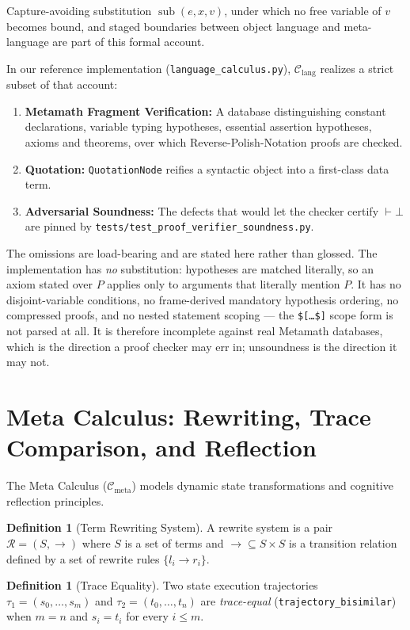 \documentclass[11pt]{article}
\theoremstyle{definition}
\newtheorem{definition}[theorem]{Definition}
\begin{document}
Capture-avoiding substitution $\operatorname{sub}(e, x, v)$, under which no free variable of $v$ becomes bound, and staged boundaries between object language and meta-language are part of this formal account.

In our reference implementation (\texttt{language\_calculus.py}), $\mathcal{C}_{\mathrm{lang}}$ realizes a strict subset of that account:
\begin{enumerate}
\item \textbf{Metamath Fragment Verification:} A database distinguishing constant declarations, variable typing hypotheses, essential assertion hypotheses, axioms and theorems, over which Reverse-Polish-Notation proofs are checked.
\item \textbf{Quotation:} \texttt{QuotationNode} reifies a syntactic object into a first-class data term.
\item \textbf{Adversarial Soundness:} The defects that would let the checker certify $\vdash \bot$ are pinned by \texttt{tests/test\_proof\_verifier\_soundness.py}.
\end{enumerate}

\noindent The omissions are load-bearing and are stated here rather than glossed. The implementation has \emph{no} substitution: hypotheses are matched literally, so an axiom stated over $P$ applies only to arguments that literally mention $P$. It has no disjoint-variable conditions, no frame-derived mandatory hypothesis ordering, no compressed proofs, and no nested statement scoping --- the \texttt{\$[\dots\$]} scope form is not parsed at all. It is therefore incomplete against real Metamath databases, which is the direction a proof checker may err in; unsoundness is the direction it may not.

\section{Meta Calculus: Rewriting, Trace Comparison, and Reflection}
The Meta Calculus ($\mathcal{C}_{\mathrm{meta}}$) models dynamic state transformations and cognitive reflection principles.

\begin{definition}[Term Rewriting System]
A rewrite system is a pair $\mathcal{R} = (S, \to)$ where $S$ is a set of terms and $\to \subseteq S \times S$ is a transition relation defined by a set of rewrite rules $\{l_i \to r_i\}$.
\end{definition}

\begin{definition}[Trace Equality]
Two state execution trajectories $\tau_1 = (s_0, \dots, s_m)$ and $\tau_2 = (t_0, \dots, t_n)$ are \emph{trace-equal} (\texttt{trajectory\_bisimilar}) when $m = n$ and $s_i = t_i$ for every $i \le m$.
\end{definition}
\end{document}
